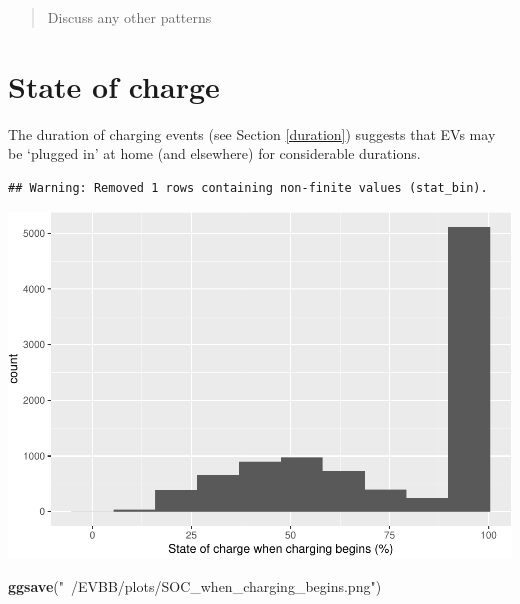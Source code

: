 \documentclass[]{article}
\newenvironment{Shaded}{\begin{snugshade}}{\end{snugshade}}
\newcommand{\KeywordTok}[1]{\textcolor[rgb]{0.13,0.29,0.53}{\textbf{#1}}}
\newcommand{\DataTypeTok}[1]{\textcolor[rgb]{0.13,0.29,0.53}{#1}}
\newcommand{\DecValTok}[1]{\textcolor[rgb]{0.00,0.00,0.81}{#1}}
\newcommand{\StringTok}[1]{\textcolor[rgb]{0.31,0.60,0.02}{#1}}
\newcommand{\OperatorTok}[1]{\textcolor[rgb]{0.81,0.36,0.00}{\textbf{#1}}}
\newcommand{\NormalTok}[1]{#1}
\begin{document}
\begin{quote}
Discuss any other patterns
\end{quote}

\section{State of charge}\label{state-of-charge}

The duration of charging events (see Section \ref{duration}) suggests
that EVs may be `plugged in' at home (and elsewhere) for considerable
durations.

\begin{Shaded}
\end{Shaded}

\begin{verbatim}
## Warning: Removed 1 rows containing non-finite values (stat_bin).
\end{verbatim}

\includegraphics{EVBB_SummaryReport_files/figure-latex/value of state of charge at beginning of charge-1.pdf}

\begin{Shaded}
\begin{Highlighting}[]
\KeywordTok{ggsave}\NormalTok{(}\StringTok{"~/EVBB/plots/SOC_when_charging_begins.png"}\NormalTok{)}
\end{Highlighting}
\end{Shaded}
\end{document}
